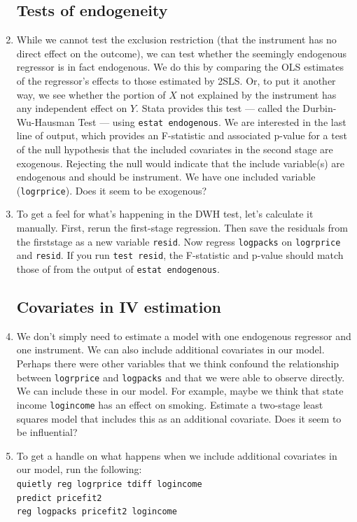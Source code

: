 \documentclass[a4paper,12pt]{article}
\begin{document}
\begin{enumerate}
\subsection*{Tests of endogeneity}

\item While we cannot test the exclusion restriction (that the instrument has no direct effect on the outcome), we can test whether the seemingly endogenous regressor is in fact endogenous. We do this by comparing the OLS estimates of the regressor's effects to those estimated by 2SLS. Or, to put it another way, we see whether the portion of $X$ not explained by the instrument has any independent effect on $Y$. Stata provides this test --- called the Durbin-Wu-Hausman Test --- using \texttt{estat endogenous}. We are interested in the last line of output, which provides an F-statistic and associated p-value for a test of the null hypothesis that the included covariates in the second stage are exogenous. Rejecting the null would indicate that the include variable(s) are endogenous and should be instrument. We have one included variable (\texttt{logrprice}). Does it seem to be exogenous?
\item To get a feel for what's happening in the DWH test, let's calculate it manually. First, rerun the first-stage regression. Then save the residuals from the firststage as a new variable \texttt{resid}. Now regress \texttt{logpacks} on \texttt{logrprice} and \texttt{resid}. If you run \texttt{test resid}, the F-statistic and p-value should match those of from the output of \texttt{estat endogenous}.


\subsection*{Covariates in IV estimation}

\item We don't simply need to estimate a model with one endogenous regressor and one instrument. We can also include additional covariates in our model. Perhaps there were other variables that we think confound the relationship between \texttt{logrprice} and \texttt{logpacks} and that we were able to observe directly. We can include these in our model. For example, maybe we think that state income \texttt{logincome} has an effect on smoking. Estimate a two-stage least squares model that includes this as an additional covariate. Does it seem to be influential?
\item To get a handle on what happens when we include additional covariates in our model, run the following:\\
\texttt{quietly reg logrprice tdiff logincome\\
predict pricefit2\\
reg logpacks pricefit2 logincome}


\end{enumerate}
\end{document}
